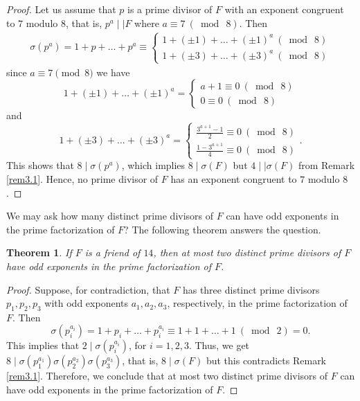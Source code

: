 \documentclass[11pt,twoside]{amsart}
\newtheorem{theorem}{Theorem}[section]
\begin{document}
\begin{proof}
Let us assume that $p$ is a prime divisor of $F$ with an exponent congruent to $7$ modulo $8$, that is, $p^a\mid\mid F$ where $a\equiv7\ (\bmod \ 8)$. Then
\begin{align*}
    \sigma(p^a)=1+p+\dots+p^{a}\equiv \left\{
\begin{array}{ll}
      1+(\pm1)+\dots+(\pm1)^a \ (\bmod \ 8) \\[1mm]
     1+(\pm 3)+\dots+(\pm3)^a \ (\bmod \ 8)
\end{array}
\right.
\end{align*}
since $a\equiv 7 \pmod 8$ we have
$$1+(\pm1)+\dots+(\pm1)^a =\left\{\begin{array}{ll}
      a+1 \equiv 0 \ (\bmod \ 8)\\[1mm]
    0\equiv 0 \ (\bmod \ 8)
\end{array}\right. $$
and
$$1+(\pm 3)+\dots+(\pm3)^a =\left\{\begin{array}{ll}
      \displaystyle{\frac{3^{a+1}-1}{2} \equiv 0 \ (\bmod \ 8)} \\[3mm]
    \displaystyle{\frac{1-3^{a+1}}{4}\equiv 0 \ (\bmod \ 8)} 
\end{array}\right. . $$
This shows that $8\mid  \sigma(p^a)$, which implies $8\mid\sigma(F)$ but $4\mid\mid\sigma(F)$ from Remark \ref{rem3.1}. Hence, no prime divisor of $F$ has an exponent congruent to $7$ modulo $8$.
\end{proof}

\smallskip

We may ask how many distinct prime divisors of $F$ can have odd exponents in the prime factorization of $F$? The following theorem answers the question.

\smallskip

\begin{theorem}
If $F$ is a friend of $14$, then at most two distinct prime divisors of $F$ have odd exponents in the prime factorization of $F$.
\end{theorem}

\begin{proof}
Suppose, for contradiction, that $F$ has three distinct prime divisors $p_1,p_2,p_3$ with odd exponents $a_1,a_2,a_3$, respectively, in the prime factorization of $F$. Then
$$\sigma(p_i^{a_i})=1+p_i+\dots +p_i^{a_i}\equiv1+1+\dots+1 \ (\bmod \ 2) =0.$$
This implies that $2\mid \sigma(p_i^{a_i})$, for $i=1,2,3$. Thus, we get $8\mid \sigma(p_1^{a_1})\sigma(p_2^{a_2})\sigma(p_3^{a_3})$, that is, $8\mid \sigma(F)$ but this contradicts Remark \ref{rem3.1}. Therefore, we conclude that at most two distinct prime divisors of $F$ can have odd exponents in the prime factorization of $F$.
\end{proof}
\end{document}
